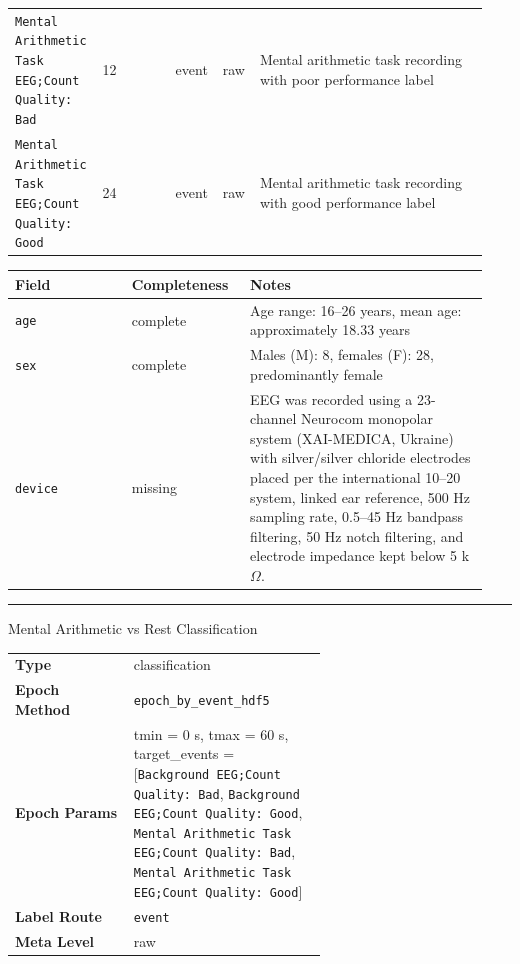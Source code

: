 {\begin{tcolorbox}
\begin{tabular}{@{}p{0.1567\linewidth}p{0.1567\linewidth}p{0.0783\linewidth}p{0.0783\linewidth}p{0.4700\linewidth}@{}}
\texttt{Mental Arithmetic Task EEG;Count Quality: Bad} & 12 & event & raw & Mental arithmetic task recording with poor performance label \\
\texttt{Mental Arithmetic Task EEG;Count Quality: Good} & 24 & event & raw & Mental arithmetic task recording with good performance label \\
\bottomrule
\end{tabular}
\endgroup
\smallskip{}\par\smallskip
\begingroup\scriptsize\setlength{\tabcolsep}{2pt}
\begin{tabular}{@{}p{0.2350\linewidth}p{0.2350\linewidth}p{0.4700\linewidth}@{}}
\toprule
\textbf{Field} & \textbf{Completeness} & \textbf{Notes} \\
\midrule
\texttt{age} & complete & Age range: 16--26 years, mean age: approximately 18.33 years \\
\texttt{sex} & complete & Males (M): 8, females (F): 28, predominantly female \\
\texttt{device} & missing & EEG was recorded using a 23-channel Neurocom monopolar system (XAI-MEDICA, Ukraine) with silver/silver chloride electrodes placed per the international 10--20 system, linked ear reference, 500 Hz sampling rate, 0.5--45 Hz bandpass filtering, 50 Hz notch filtering, and electrode impedance kept below 5 k$\Omega$. \\
\bottomrule
\end{tabular}
\endgroup
\noindent\rule{\linewidth}{0.7pt}\par\nopagebreak
{}
 {\footnotesize Mental Arithmetic vs Rest Classification}\par\smallskip
{\footnotesize\begin{tabular}{@{}lp{0.62\linewidth}@{}}
\textbf{Type} & classification \\
\textbf{Epoch Method} & \texttt{epoch\_by\_event\_hdf5} \\
\textbf{Epoch Params} & tmin = 0 s, tmax = 60 s, target\_events = [\texttt{Background EEG;Count Quality: Bad}, \texttt{Background EEG;Count Quality: Good}, \texttt{Mental Arithmetic Task EEG;Count Quality: Bad}, \texttt{Mental Arithmetic Task EEG;Count Quality: Good}] \\
\textbf{Label Route} & \texttt{event} \\
\textbf{Meta Level} & raw \\
\end{tabular}}

\end{tcolorbox}}
